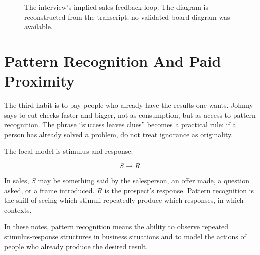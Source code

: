 \begin{figure}
\centering
{}
\caption{The interview's implied sales feedback loop. The diagram is reconstructed from the transcript; no validated board diagram was available.}
\end{figure}

\section{Pattern Recognition And Paid Proximity}

The third habit is to pay people who already have the results one wants. Johnny says to cut checks faster and bigger, not as consumption, but as access to pattern recognition. The phrase ``success leaves clues'' becomes a practical rule: if a person has already solved a problem, do not treat ignorance as originality.

The local model is stimulus and response:

\begin{equation}
S \longrightarrow R.
\end{equation}

In sales, \(S\) may be something said by the salesperson, an offer made, a question asked, or a frame introduced. \(R\) is the prospect's response. Pattern recognition is the skill of seeing which stimuli repeatedly produce which responses, in which contexts.

\begin{definition}
In these notes, pattern recognition means the ability to observe repeated stimulus-response structures in business situations and to model the actions of people who already produce the desired result.
\end{definition}


